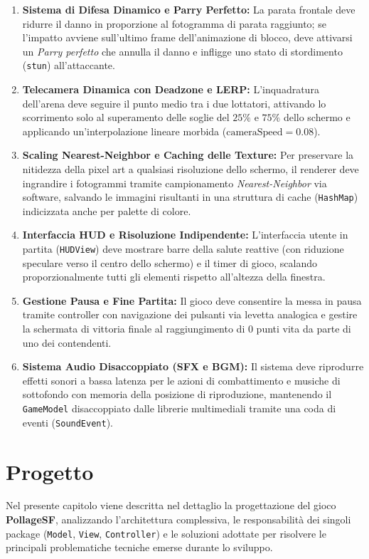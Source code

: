 \documentclass[11pt, a4paper]{article}
\begin{document}
\begin{enumerate}
    \item \textbf{Sistema di Difesa Dinamico e Parry Perfetto:} La parata frontale deve ridurre il danno in proporzione al fotogramma di parata raggiunto; se l'impatto avviene sull'ultimo frame dell'animazione di blocco, deve attivarsi un \emph{Parry perfetto} che annulla il danno e infligge uno stato di stordimento (\texttt{stun}) all'attaccante.
    \item \textbf{Telecamera Dinamica con Deadzone e LERP:} L'inquadratura dell'arena deve seguire il punto medio tra i due lottatori, attivando lo scorrimento solo al superamento delle soglie del $25\%$ e $75\%$ dello schermo e applicando un'interpolazione lineare morbida ($\text{cameraSpeed} = 0.08$).
    \item \textbf{Scaling Nearest-Neighbor e Caching delle Texture:} Per preservare la nitidezza della pixel art a qualsiasi risoluzione dello schermo, il renderer deve ingrandire i fotogrammi tramite campionamento \emph{Nearest-Neighbor} via software, salvando le immagini risultanti in una struttura di cache (\texttt{HashMap}) indicizzata anche per palette di colore.
    \item \textbf{Interfaccia HUD e Risoluzione Indipendente:} L'interfaccia utente in partita (\texttt{HUDView}) deve mostrare barre della salute reattive (con riduzione speculare verso il centro dello schermo) e il timer di gioco, scalando proporzionalmente tutti gli elementi rispetto all'altezza della finestra.
    \item \textbf{Gestione Pausa e Fine Partita:} Il gioco deve consentire la messa in pausa tramite controller con navigazione dei pulsanti via levetta analogica e gestire la schermata di vittoria finale al raggiungimento di 0 punti vita da parte di uno dei contendenti.
    \item \textbf{Sistema Audio Disaccoppiato (SFX e BGM):} Il sistema deve riprodurre effetti sonori a bassa latenza per le azioni di combattimento e musiche di sottofondo con memoria della posizione di riproduzione, mantenendo il \texttt{GameModel} disaccoppiato dalle librerie multimediali tramite una coda di eventi (\texttt{SoundEvent}).
\end{enumerate}

\newpage

\section{Progetto}
Nel presente capitolo viene descritta nel dettaglio la progettazione del gioco \textbf{PollageSF}, analizzando l'architettura complessiva, le responsabilità dei singoli package (\texttt{Model}, \texttt{View}, \texttt{Controller}) e le soluzioni adottate per risolvere le principali problematiche tecniche emerse durante lo sviluppo.
\end{document}
